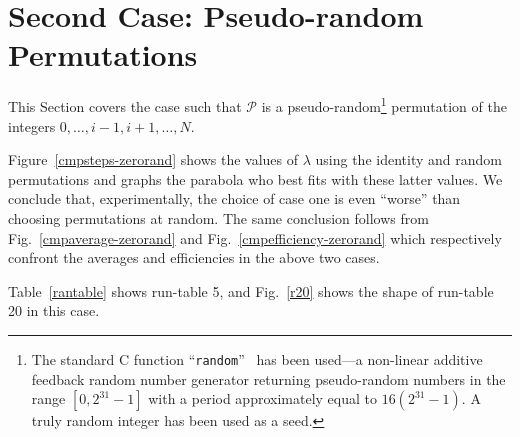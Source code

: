 \documentclass{elsart}
\begin{document}
\section{Second Case: Pseudo-random Permutations}\label{randcase}
This Section covers the case such that
$\mathcal P$ is a pseudo-random\footnote{The standard C function ``{\tt random}''~\cite{Rand} has been 
	used---a non-linear additive feedback random number
	generator returning pseudo-random numbers in the range $[0,2^{31}-1]$
	with a period approximately equal to $16(2^{31}-1)$. A truly
	random integer has been used as a seed.}
permutation of the integers $0,\dots,i-1,i+1,\dots,N$.

Figure~\ref{cmpsteps-zerorand} shows the values of $\lambda$
using the identity and random permutations
and graphs the parabola who best fits with these latter values.
We conclude that, experimentally, the choice of case one is 
even ``worse'' than choosing permutations at random.
The same conclusion follows from
Fig.~\ref{cmpaverage-zerorand} and Fig.~\ref{cmpefficiency-zerorand}
which respectively confront the averages and efficiencies
in the above two cases.

Table~\ref{rantable} shows run-table 5, and
Fig.~\ref{r20} shows the shape of run-table 20 in this case.
\end{document}
